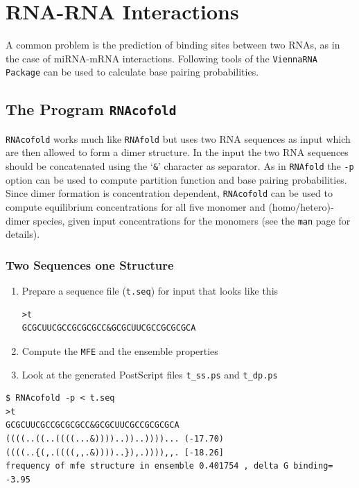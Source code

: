 \documentclass[a4paper]{article}
\newcommand{\frametitle}[1]{\subsubsection{#1}}
\begin{document}
\section{RNA-RNA Interactions}
A common problem is the prediction of binding sites between two RNAs, as in
the case of miRNA-mRNA interactions. Following tools of the \texttt{ViennaRNA Package}
can be used to calculate base pairing probabilities.

\subsection{The Program \texttt{RNAcofold}}
\texttt{RNAcofold} works much like \texttt{RNAfold} but uses 
two RNA sequences as input which are then allowed to form a dimer
structure. In the input the two RNA sequences should be concatenated using
the `\texttt{\&}' character as separator.
As in \texttt{RNAfold} the \texttt{-p} option can be used to compute
partition function and base pairing probabilities.\\

Since dimer formation is concentration dependent, \texttt{RNAcofold}
can be used to compute equilibrium concentrations for all five monomer
and (homo/hetero)-dimer species, given input concentrations for the
monomers (see the \texttt{man} page for details).
  \frametitle{Two Sequences one Structure}

  \begin{enumerate}
  \item Prepare a sequence file (\texttt{t.seq}) for input that looks like this
\begin{verbatim}
>t
GCGCUUCGCCGCGCGCC&GCGCUUCGCCGCGCGCA
\end{verbatim}
  \item Compute the \texttt{MFE} and the ensemble properties
  \item Look at the generated PostScript files \texttt{t\_ss.ps}
  and \texttt{t\_dp.ps}
  \end{enumerate}
\begin{verbatim}
$ RNAcofold -p < t.seq
>t
GCGCUUCGCCGCGCGCC&GCGCUUCGCCGCGCGCA
((((..((..((((...&))))..))..))))... (-17.70)
((((..{(,.((((,,.&))))..}),.)))),,. [-18.26]
frequency of mfe structure in ensemble 0.401754 , delta G binding= -3.95
\end{verbatim}%
\end{document}
